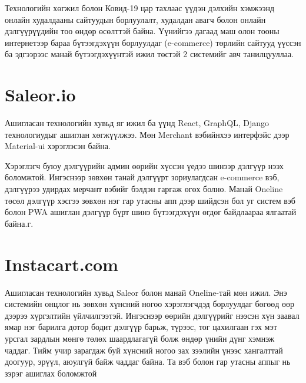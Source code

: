 Технологийн хөгжил болон Ковид-19 цар тахлаас үүдэн дэлхийн хэмжээнд онлайн худалдааны сайтуудын борлуулалт, худалдан авагч болон онлайн дэлгүүрүүдийн тоо өндөр өсөлттэй байна. Үүнийгээ дагаад маш олон тооны интернетээр бараа бүтээгдэхүүн борлуулдаг (e-commerce) төрлийн сайтууд үүссэн ба эдгээрээс манай бүтээгдэхүүнтэй ижил төстэй 2 системийг авч танилцууллаа.

    
    
    \section{Saleor.io}
Ашигласан технологийн хувьд яг ижил ба үүнд React, GraphQL, Django технологиудыг ашиглан хөгжүүлжээ. Мөн Merchant вэбийнхээ интерфэйс дээр Material-ui хэрэглэсэн байна. 

Хэрэглэгч буюу дэлгүүрийн админ өөрийн хүссэн үедээ шинээр дэлгүүр нээх боломжтой. Ингэснээр зөвхөн танай дэлгүүрт зориулагдсан e-commerce вэб, дэлгүүрээ удирдах мерчант вэбийг бэлдэн гаргаж өгөх болно. Манай Oneline төсөл дэлгүүр хэсгээ зөвхөн нэг гар утасны апп дээр шийдсэн бол уг систем вэб болон PWA ашиглан дэлгүүр бүрт шинэ бүтээгдэхүүн өгдөг байдлаараа ялгаатай байна.г. 


\section{Instacart.com}
Ашигласан технологийн хувьд Saleor болон манай Oneline-тай мөн ижил. Энэ системийн онцлог нь зөвхөн хүнсний ногоо хэрэглэгчдэд борлуулдаг бөгөөд өөр дээрээ хүргэлтийн үйлчилгээтэй. Ингэснээр өөрийн дэлгүүрийг нээсэн хүн заавал ямар нэг барилга дотор бодит дэлгүүр барьж, түрээс, тог цахилгаан гэх мэт урсгал зардлын мөнгө төлөх шаардлагагүй болж өндөр үнийн дүнг хэмнэж чаддаг. Тийм учир зарагдаж буй хүнсний ногоо зах зээлийн үнээс хангалттай доогуур, эрүүл, аюулгүй байж чаддаг байна. Та вэб болон гар утасны аппыг нь зэрэг ашиглах боломжтой